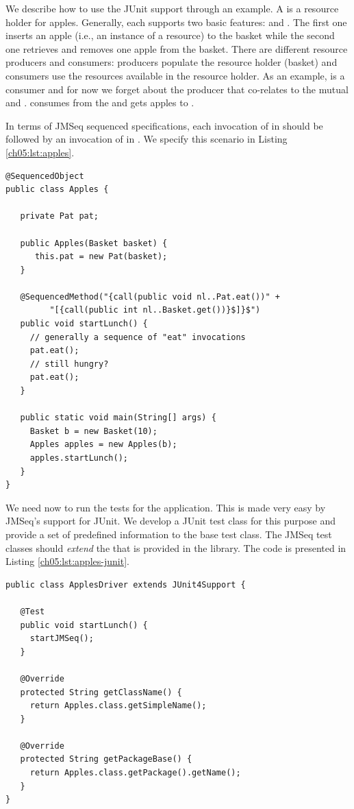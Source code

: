 We describe how to use the JUnit support through an example. 
A  is a resource holder for apples. Generally, each
 supports two basic features:  and
. The first one inserts an apple (i.e., an instance of a
resource) to the basket while the second one retrieves and removes one
apple from the basket. There are different resource producers and
consumers: producers populate the resource holder (basket) and
consumers use the resources available in the resource holder. As an
example,  is a consumer and for now we forget about the
producer that co-relates to the mutual  and
.  consumes from the  and gets
apples to .

In terms of JMSeq sequenced specifications, each invocation of
 in  should be followed by an invocation of
 in . We specify this scenario in Listing
\ref{ch05:lst:apples}.

\lstset{language=Java}
\begin{lstlisting}[label=ch05:lst:apples, caption=Apples JMSeq Specification]
@SequencedObject
public class Apples {

   private Pat pat;
   
   public Apples(Basket basket) {
      this.pat = new Pat(basket);
   }
  
   @SequencedMethod("{call(public void nl..Pat.eat())" +
         "[{call(public int nl..Basket.get())}$]}$")
   public void startLunch() {
     // generally a sequence of "eat" invocations
     pat.eat();
     // still hungry?
     pat.eat();
   }

   public static void main(String[] args) {
     Basket b = new Basket(10);
     Apples apples = new Apples(b);
     apples.startLunch();
   }
}
\end{lstlisting}

We need now to run the tests for the  application.
This is made very easy by JMSeq's support for JUnit. 
We develop a JUnit
test class for this purpose and provide a set of predefined information
to the base test class. The JMSeq test classes should \textsl{extend}
the  that is provided in the library. The code is
presented in Listing \ref{ch05:lst:apples-junit}.

\lstset{language=Java}
\begin{lstlisting}[label=ch05:lst:apples-junit, caption=Apples JMSeq JUnit
Test Unit]
public class ApplesDriver extends JUnit4Support {

   @Test
   public void startLunch() {
     startJMSeq();
   }

   @Override
   protected String getClassName() {
     return Apples.class.getSimpleName();
   }

   @Override
   protected String getPackageBase() {
     return Apples.class.getPackage().getName();
   }
}
\end{lstlisting}

